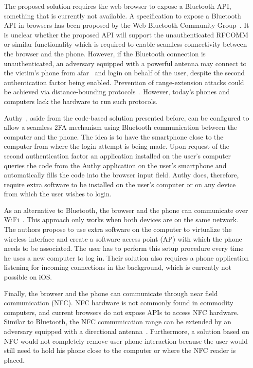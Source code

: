 The proposed solution requires the web browser to expose a Bluetooth API, something that is currently not available.
A specification to expose a Bluetooth API in browsers has been proposed by the Web Bluetooth Community Group~\cite{w3cwebbluetooth}.
It is unclear whether the proposed API will support the unauthenticated RFCOMM or similar functionality which is required to enable seamless connectivity between the browser and the phone.
However, if the Bluetooth connection is unauthenticated, an adversary equipped with a powerful antenna may connect to the victim's phone from afar~\cite{aircable} and login on behalf of the user, despite the second authentication factor being enabled.
Prevention of range-extension attacks could be achieved via distance-bounding protocols~\cite{rasmussen10usenix}. However, today's phones and computers lack the hardware to run such protocols.

Authy~\cite{authy}, aside from the code-based solution presented before, can be configured to allow a seamless 2FA mechanism using Bluetooth communication between the computer and the phone. The idea is to have the smartphone close to the computer from where the login attempt is being made. Upon request of the second authentication factor an application installed on the user's computer queries the code from the Authy application on the user's smartphone and automatically fills the code into the browser input field. Authy does, therefore, require extra software to be installed on the user's computer or on any device from which the user wishes to login.

As an alternative to Bluetooth, the browser and the phone can communicate over WiFi~\cite{shirvanian14}.
This approach only works when both devices are on the same network.
The authors propose to use extra software on the computer to virtualize the wireless interface and create a software access point (AP) with which the phone needs to be associated. The user has to perform this setup procedure every time he uses a new computer to log in.
Their solution also requires a phone application listening for incoming connections in the background, which is currently not possible on iOS.

Finally, the browser and the phone can communicate through near field communication (NFC). NFC hardware is not commonly found in commodity computers, and current browsers do not expose APIs to access NFC hardware.
Similar to Bluetooth, the NFC communication range can be extended by an adversary equipped with a directional antenna~\cite{diakos13joe, haselsteiber06rfidsec}.
Furthermore, a solution based on NFC would not completely remove user-phone interaction because the user would still need to hold his phone close to the computer or where the NFC reader is placed.

